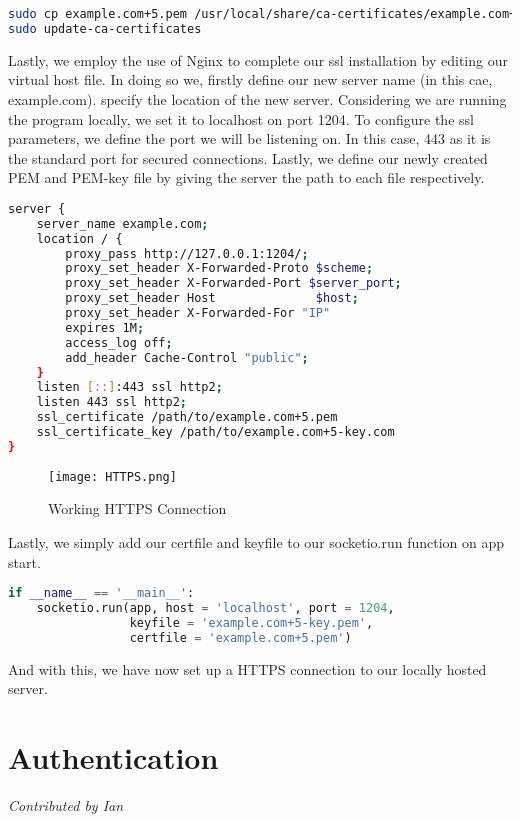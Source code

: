 \documentclass{article}
\begin{document}
\begin{lstlisting}[language=bash]
sudo cp example.com+5.pem /usr/local/share/ca-certificates/example.com+5.crt
sudo update-ca-certificates
\end{lstlisting}

Lastly, we employ the use of Nginx to complete our ssl installation by editing our virtual host file. In doing so we, firstly define our new server name (in this cae, example.com). specify the location of the new server. Considering we are running the program locally, we set it to localhost on port 1204. To configure the ssl parameters, we define the port we will be listening on. In this case, 443 as it is the standard port for secured connections. Lastly, we define our newly created PEM and PEM-key file by giving the server the path to each file respectively.

\begin{lstlisting}[language=bash]
server {
    server_name example.com;
    location / {
        proxy_pass http://127.0.0.1:1204/;
        proxy_set_header X-Forwarded-Proto $scheme;
        proxy_set_header X-Forwarded-Port $server_port;
        proxy_set_header Host              $host;
        proxy_set_header X-Forwarded-For "IP"
        expires 1M;
        access_log off;
        add_header Cache-Control "public";
    }
    listen [::]:443 ssl http2;
    listen 443 ssl http2;
    ssl_certificate /path/to/example.com+5.pem
    ssl_certificate_key /path/to/example.com+5-key.com
}
\end{lstlisting}

\begin{figure}[H]
    \centering
    \texttt{[image: HTTPS.png]}
    \caption{Working HTTPS Connection}
    \label{fig:enter-label}
\end{figure}

Lastly, we simply add our certfile and keyfile to our socketio.run function on app start.
\begin{lstlisting}[language=Python]
if __name__ == '__main__':
    socketio.run(app, host = 'localhost', port = 1204,
                 keyfile = 'example.com+5-key.pem',
                 certfile = 'example.com+5.pem')
\end{lstlisting}

And with this, we have now set up a HTTPS connection to our locally hosted server.

\section{Authentication}
\textit{Contributed by Ian}
\end{document}
